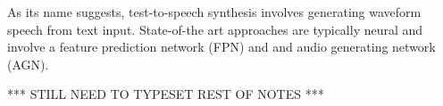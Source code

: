 As its name suggests, test-to-speech synthesis involves generating waveform speech from text input. 
State-of-the art approaches are typically neural and involve a feature prediction network (FPN) and 
and audio generating network (AGN).

*** STILL NEED TO TYPESET REST OF NOTES ***
